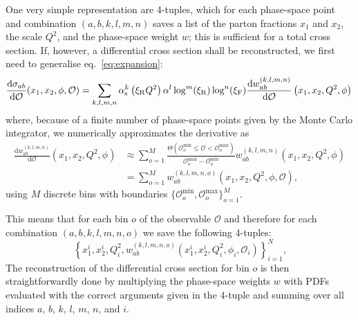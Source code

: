 One very simple representation are 4-tuples, which for each phase-space point and combination $(a, b, k, l, m, n)$ saves a list of the parton fractions $x_1$ and $x_2$, the scale $Q^2$, and the phase-space weight $w$; this is sufficient for a total cross section.
If, however, a differential cross section shall be reconstructed, we first need to generalise eq.~\eqref{eq:expansion}:
\begin{equation}
\frac{\mathrm{d} \sigma_{ab}}{\mathrm{d} \mathcal{O}} (x_1, x_2, \phi, \mathcal{O}) = \sum_{k,l,m,n} \alpha_\mathrm{s}^k \left( \xi_\mathrm{R} Q^2 \right) \alpha^l \log^m ( \xi_\mathrm{R} ) \log^n ( \xi_\mathrm{F} ) \frac{\mathrm{d} w_{ab}^{(k,l,m,n)}}{\mathrm{d} \mathcal{O}} \left( x_1, x_2, Q^2, \phi \right) \\
\end{equation}
where, because of a finite number of phase-space points given by the Monte Carlo integrator, we numerically approximates the derivative as
\begin{equation}
\begin{split}
\frac{\mathrm{d} w_{ab}^{(k,l,m,n)}}{\mathrm{d} \mathcal{O}} \left( x_1, x_2, Q^2, \phi \right) &\approx \sum_{o=1}^M \frac{\Theta (\mathcal{O}_o^\mathrm{min} \le \mathcal{O} < \mathcal{O}_o^\mathrm{max})}{\mathcal{O}_o^\mathrm{max} - \mathcal{O}_o^\mathrm{min}} w_{ab}^{(k,l,m,n)} \left( x_1, x_2, Q^2, \phi \right) \\
&= \sum_{o=1}^M w_{ab}^{(k,l,m,n,o)} \left( x_1, x_2, Q^2, \phi, \mathcal{O} \right) \text{,}
\end{split}
\end{equation}
using $M$ discrete bins with boundaries $\{ \mathcal{O}_o^\mathrm{min}, \mathcal{O}_o^\mathrm{max} \}_{o=1}^M$.

This means that for each bin $o$ of the observable $\mathcal{O}$ and therefore for each combination $(a,b,k,l,m,n,o)$ we save the following 4-tuples:
\begin{equation}
\left\{ x_1^i, x_2^i, Q^2_i, w^{(k,l,m,n,o)}_{ab} (x_1^i, x_2^i, Q^2_i, \phi_i, \mathcal{O}_i) \right\}_{i=1}^N \text{,} \label{eq:four-tuples}
\end{equation}
The reconstruction of the differential cross section for bin $o$ is then straightforwardly done by multiplying the phase-space weights $w$ with PDFs evaluated with the correct arguments given in the 4-tuple and summing over all indices $a$, $b$, $k$, $l$, $m$, $n$, and $i$.


